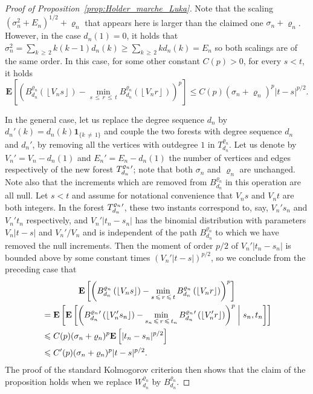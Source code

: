 \documentclass[10pt]{amsart}
\theoremstyle{definition}\newtheorem{defi}[theo]{Definition}\newtheorem{rema}[theo]{Remark}\newtheorem{exam}[theo]{Example}\newtheorem{exem}[theo]{Example}\newtheorem{nota}[theo]{Notation}
\newcommand{\ensembles}[1]{\mathbf{#1}}
\newcommand{\E}{\ensembles{E}}
\newcommand{\Es}[1]{\E\left[#1\right]}
\newcommand{\Esc}[2]{\E\left[#1 \;\middle|\; #2\right]}
\newcommand{\1}{\ensembles{1}}
\newcommand{\ind}[1]{\1_{\{#1\}}}
\renewcommand{\le}{\leqslant}
\renewcommand{\ge}{\geqslant}
\newcommand{\fn}{T_{d_n}^{\varrho_n}}
\newcommand{\Wfn}{W_{d_n}^{\varrho_n}}
\newcommand{\Bfn}{B_{d_n}^{\varrho_n}}
\newcommand{\edges}{E}
\newcommand{\vertices}{V}
\providecommand{\?}{}
\begin{document}
\begin{proof}[Proof of Proposition~\ref{prop:Holder_marche_Luka}]
Note that the scaling $(\sigma_n^{2}+\edges_{n})^{1/2} + \varrho_n$ that appears here is larger than the claimed one $\sigma_n + \varrho_n$. However, in the case $d_{n}(1) = 0$, it holds that $\sigma_{n}^{2} = \sum_{k\,\ge\, 2} k(k-1)d_{n}(k) \ge \sum_{k\,\ge\,2} kd_{n}(k) = \edges_{n}$ so both scalings are of the same order. In this case, for some other constant $C(p) > 0$, for every $s<t$, it holds
\[
\Es{\left(\Bfn\left(\left\lfloor\vertices_ns\right\rfloor\right) - \min_{s\,\le\,r\,\le\,t} \Bfn\left(\left\lfloor\vertices_nr\right\rfloor\right)\right)^p}
\le C(p) \left(\sigma_n + \varrho_n\right)^p |t-s|^{p/2}.
\]

In the general case, let us replace the degree sequence $d_n$ by $d_n'(k) = d_n(k) \ind{k\,\ne\,1}$ and couple the two forests with degree sequence $d_n$ and $d_n'$, by removing all the vertices with outdegree $1$ in $\fn$. Let us denote by $\vertices_{n}' = \vertices_{n}-d_{n}(1)$ and $\edges_{n}' = \edges_{n}-d_{n}(1)$ the number of vertices and edges respectively of the new forest ${\fn}\vphantom{T}'$; note that both $\sigma_n$ and $\varrho_{n}$ are unchanged. Note also that the increments which are removed from $\Bfn$ in this operation are all null. Let $s<t$ and assume for notational convenience that $\vertices_{n}s$ and $\vertices_{n} t$ are both integers. In the forest ${\fn}\vphantom{T}'$, these two instants correspond to, say, $\vertices_{n}'s_{n}$ and $\vertices_{n}'t_{n}$ respectively, and $\vertices_{n}' |t_{n}-s_{n}|$ has the binomial distribution with parameters $\vertices_{n} |t-s|$ and $\vertices_{n}'/\vertices_{n}$ and is independent of the path $\Bfn$ to which we have removed the null increments. Then the moment of order $p/2$ of $\vertices_{n}' |t_{n}-s_{n}|$ is bounded above by some constant times $(\vertices_{n}' |t-s|)^{p/2}$, so we conclude from the preceding case that
\begin{multline*}
\Es{\left(\Bfn\left(\left\lfloor\vertices_ns\right\rfloor\right) - \min_{s\,\le\,r\,\le\,t} \Bfn\left(\left\lfloor\vertices_nr\right\rfloor\right)\right)^p}
\\
\begin{aligned}
&= \Es{\Esc{\left(\Bfn\vphantom{B}'\left(\left\lfloor\vertices_n' s_{n}\right\rfloor\right) - \min_{s_{n}\,\le\,r\,\le\,t_{n}} \Bfn\vphantom{B}'\left(\left\lfloor\vertices_n' r\right\rfloor\right)\right)^p}{s_{n}, t_{n}}}
\\
&\le C(p) (\sigma_n + \varrho_n)^p \Es{|t_{n}-s_{n}|^{p/2}}
\\
&\le C'(p) (\sigma_n + \varrho_n)^p |t-s|^{p/2}.
\end{aligned}
\end{multline*}
The proof of the standard Kolmogorov criterion then shows that the claim of the proposition holds when we replace $\Wfn$ by $\Bfn$.



\end{proof}
\end{document}
